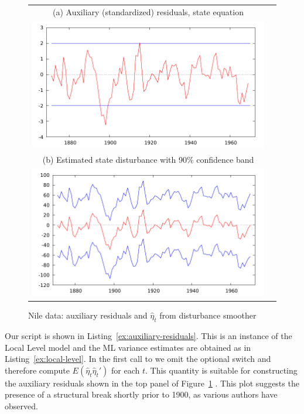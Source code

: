 \begin{figure}[htbp]
  \centering
  \begin{tabular}{cc}
  \small
  (a) Auxiliary (standardized) residuals, state equation \\
    \includegraphics{figures/nile_eta_ksd} \\[14pt]
  \small (b) Estimated state disturbance with 90\% confidence band \\
  \includegraphics{figures/nile_eta_dk}
  \end{tabular}
  \caption{Nile data: auxiliary residuals and $\hat{\eta}_t$
    from disturbance smoother}
  \label{fig:nile}
\end{figure}

Our script is shown in Listing~\ref{ex:auxiliary-residuals}. This is an
instance of the Local Level model and the ML variance estimates are
obtained as in Listing~\ref{ex:local-level}. In the first call to
 we omit the optional switch and therefore compute
$E(\hat{\eta}_t\hat{\eta}_t')$ for each $t$. This quantity is suitable
for constructing the auxiliary residuals shown in the top panel of
Figure~\ref{fig:nile} \citep[for similar plots
see][]{koopman-etal99,pelagatti11}.  This plot suggests the presence
of a structural break shortly prior to 1900, as various authors have
observed.

